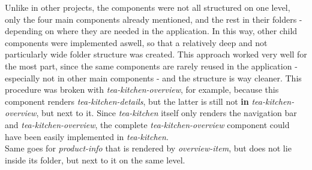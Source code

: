 Unlike in other projects, the components were not all structured on one level, only the four main components already mentioned, and the rest in their folders - depending on where they are needed in the application. In this way, other child components were implemented aswell, so that a relatively deep and not particularly wide folder structure was created. This approach worked very well for the most part, since the same components are rarely reused in the application - especially not in other main components - and the structure is way cleaner. This procedure was broken with \textit{tea-kitchen-overview}, for example, because this component renders \textit{tea-kitchen-details}, but the latter is still not \textbf{in} \textit{tea-kitchen-overview}, but next to it. Since \textit{tea-kitchen} itself only renders the navigation bar and \textit{tea-kitchen-overview}, the complete \textit{tea-kitchen-overview} component could have been easily implemented in \textit{tea-kitchen}. \\
Same goes for \textit{product-info} that is rendered by \textit{overview-item}, but does not lie inside its folder, but next to it on the same level.

